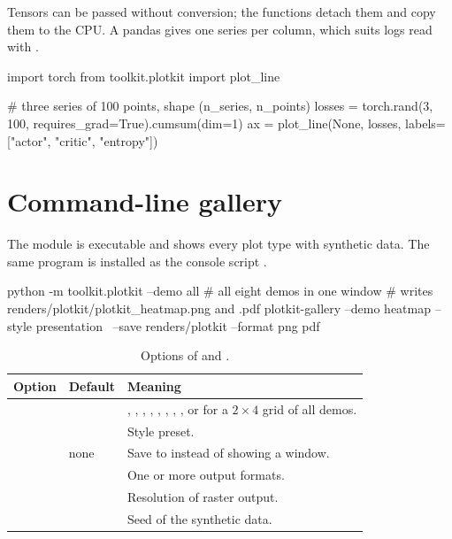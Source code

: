 Tensors can be passed without conversion; the functions detach them and copy
them to the CPU. A pandas  gives one series per column, which
suits logs read with .

\begin{pycode}
import torch
from toolkit.plotkit import plot_line

# three series of 100 points, shape (n_series, n_points)
losses = torch.rand(3, 100, requires_grad=True).cumsum(dim=1)
ax = plot_line(None, losses, labels=["actor", "critic", "entropy"])
\end{pycode}

\section{Command-line gallery}\label{sec:plotkit-cli}

The module is executable and shows every plot type with synthetic data. The
same program is installed as the console script .

\begin{shellcode}
python -m toolkit.plotkit --demo all        # all eight demos in one window
# writes renders/plotkit/plotkit_heatmap.png and .pdf
plotkit-gallery --demo heatmap --style presentation \
    --save renders/plotkit --format png pdf
\end{shellcode}

\begin{table}[htbp]
  \centering
  \small
  \caption{Options of  and .}
  \label{tab:plotkit-cli}
  \begin{tabularx}{\textwidth}{@{}>{\raggedright\arraybackslash}p{3.0cm}>{\raggedright\arraybackslash}p{2.1cm}>{\raggedright\arraybackslash}X@{}}
    \toprule
    Option & Default & Meaning \\
    \midrule
    \code{-{}-demo} & \code{all} & \code{shadow}, \code{learning}, \code{heatmap}, \code{grayscale}, \code{line}, \code{bar}, \code{scatter}, \code{histogram}, or \code{all} for a $2 \times 4$ grid of all demos. \\
    \code{-{}-style} & \code{research} & Style preset. \\
    \code{-{}-save DIR} & none & Save to \code{DIR/plotkit\_<demo>.<format>} instead of showing a window. \\
    \code{-{}-format} & \code{png} & One or more output formats. \\
    \code{-{}-dpi} & \code{150} & Resolution of raster output. \\
    \code{-{}-seed} & \code{0} & Seed of the synthetic data. \\
    \bottomrule
  \end{tabularx}
\end{table}

